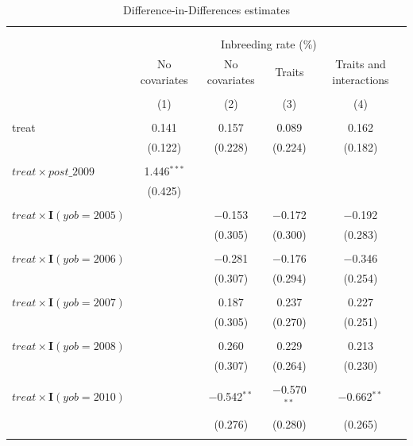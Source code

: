 
\begin{table}[H] \centering 
  \caption{Difference-in-Differences estimates} 
  \label{tab:table1} 
\small 
\begin{tabular}{@{\extracolsep{5pt}}lcccc} 
\\[-1.8ex]\hline 
\hline \\[-1.8ex] 
\\[-1.8ex] & \multicolumn{4}{c}{Inbreeding rate (\%)} \\ 
 & No covariates & No covariates & Traits & Traits and interactions \\ 
\\[-1.8ex] & (1) & (2) & (3) & (4)\\ 
\hline \\[-1.8ex] 
 treat & 0.141 & 0.157 & 0.089 & 0.162 \\ 
  & (0.122) & (0.228) & (0.224) & (0.182) \\ 
  & & & & \\ 
 $treat \times post\_2009$ & 1.446$^{***}$ &  &  &  \\ 
  & (0.425) &  &  &  \\ 
  & & & & \\ 
 $treat \times\mathbf{I}(yob = 2005)$ &  & $-$0.153 & $-$0.172 & $-$0.192 \\ 
  &  & (0.305) & (0.300) & (0.283) \\ 
  & & & & \\ 
 $treat \times\mathbf{I}(yob = 2006)$ &  & $-$0.281 & $-$0.176 & $-$0.346 \\ 
  &  & (0.307) & (0.294) & (0.254) \\ 
  & & & & \\ 
 $treat \times\mathbf{I}(yob = 2007)$ &  & 0.187 & 0.237 & 0.227 \\ 
  &  & (0.305) & (0.270) & (0.251) \\ 
  & & & & \\ 
 $treat \times\mathbf{I}(yob = 2008)$ &  & 0.260 & 0.229 & 0.213 \\ 
  &  & (0.307) & (0.264) & (0.230) \\ 
  & & & & \\ 
 $treat \times\mathbf{I}(yob = 2010)$ &  & $-$0.542$^{**}$ & $-$0.570$^{**}$ & $-$0.662$^{**}$ \\ 
  &  & (0.276) & (0.280) & (0.265) \\ 
  & & & & \\ 

\end{tabular}
\end{table}

